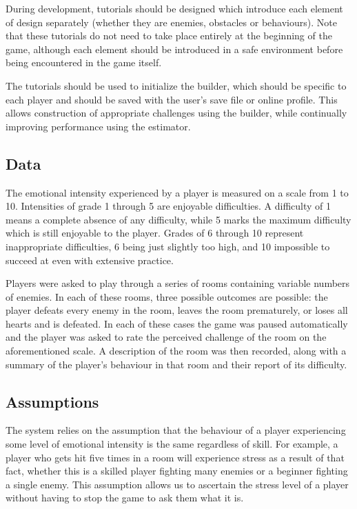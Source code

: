 \documentclass[a4paper]{article}
\begin{document}
\begin{multicols*}{2}
During development, tutorials should be designed which introduce each element of design separately (whether they are enemies, obstacles or behaviours). Note that these tutorials do not need to take place entirely at the beginning of the game, although each element should be introduced in a safe environment before being encountered in the game itself.

The tutorials should be used to initialize the builder, which should be specific to each player and should be saved with the user's save file or online profile. This allows construction of appropriate challenges using the builder, while continually improving performance using the estimator.

\subsection{Data} \label{data}
The emotional intensity experienced by a player is measured on a scale from 1 to 10. Intensities of grade 1 through 5 are enjoyable difficulties. A difficulty of 1 means a complete absence of any difficulty, while 5 marks the maximum difficulty which is still enjoyable to the player. Grades of 6 through 10 represent inappropriate difficulties, 6 being just slightly too high, and 10 impossible to succeed at even with extensive practice.

Players were asked to play through a series of rooms containing variable numbers of enemies. In each of these rooms, three possible outcomes are possible: the player  defeats every enemy in the room, leaves the room prematurely, or loses all hearts and is defeated. In each of these cases the game was paused automatically and the player was asked to rate the perceived challenge of the room on the aforementioned scale. A description of the room was then recorded, along with a summary of the player's behaviour in that room and their report of its difficulty.

\subsection{Assumptions}
The system relies on the assumption that the behaviour of a player experiencing some level of emotional intensity is the same regardless of skill. For example, a player who gets hit five times in a room will experience stress as a result of that fact, whether this is a skilled player fighting many enemies or a beginner fighting a single enemy. This assumption allows us to ascertain the stress level of a player without having to stop the game to ask them what it is.


\end{multicols*}
\end{document}
